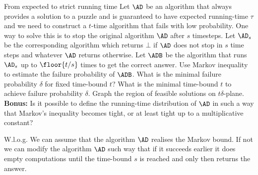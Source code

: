 \documentclass{crypto-exercise}
\author[Formalisation of folklore]{Sven Laur}
\begin{document}
\begin{exercise}{From expected to strict running time}
Let $\AD$ be an algorithm that always provides a solution to a puzzle and is guaranteed to have expected running-time $\tau$ and we need to construct a $t$-time algorithm that fails with low probability. One way to solve this is to stop the original algorithm $\AD$ after $s$ timesteps. Let $\AD_s$ be the corresponding algorithm which returns $\bot$ if $\AD$ does not stop in $s$ time steps and  whatever $\AD$ returns otherwise. Let $\ADB$ be the algorithm that runs $\AD_s$ up to $\floor{t/s}$ times to get the correct answer.
Use Markov inequality to estimate the failure probability of $\ADB$.  What is the minimal failure probability $\delta$ for fixed time-bound $t$? What is the minimal time-bound $t$ to achieve failure probability $\delta$. Graph the region of feasible solutions on $t\delta$-plane. \\ 

\noindent\textbf{Bonus:} Is it possible to define the running-time distribution of $\AD$ in such a way that Markov's inequality becomes tight, or at least tight up to a multiplicative constant?
\end{exercise}

\begin{solution}
W.l.o.g. We can assume that the algorithm $\AD$  realises the Markov bound. If not we can modify the algorithm $\AD$ such way that if it succeeds earlier it does empty computations until the time-bound $s$ is reached and only then returns the answer.  


\end{solution}
\end{document}
